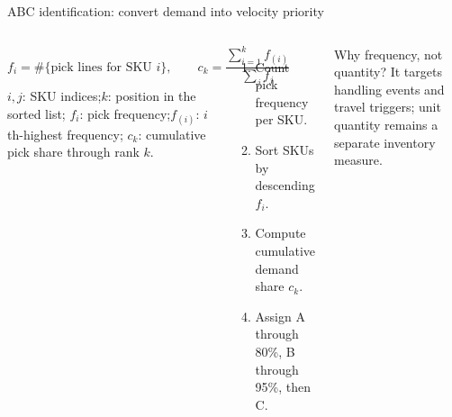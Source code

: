 \documentclass[aspectratio=169,10pt]{beamer}
\begin{document}
\begin{frame}{ABC identification: convert demand into velocity priority}
  \begin{columns}[T,onlytextwidth]
    \[
      f_i = \#\{\text{pick lines for SKU }i\},\qquad
      c_k = \frac{\sum_{i=1}^{k}f_{(i)}}{\sum_j f_j}
    \]
    {\scriptsize $i,j$: SKU indices;\quad $k$: position in the sorted list;\quad
    $f_i$: pick frequency;\quad $f_{(i)}$: $i$th-highest frequency;\quad
    $c_k$: cumulative pick share through rank $k$.}

    \begin{enumerate}
      \item Count pick frequency per SKU.
      \item Sort SKUs by descending $f_i$.
      \item Compute cumulative demand share $c_k$.
      \item Assign A through 80\%, B through 95\%, then C.
    \end{enumerate}
    \vspace{0.45cm}
    \begin{block}{Why frequency, not quantity?}
      It targets handling events and travel triggers; unit quantity remains a
      separate inventory measure.
    \end{block}
  \end{columns}
\end{frame}
\end{document}
